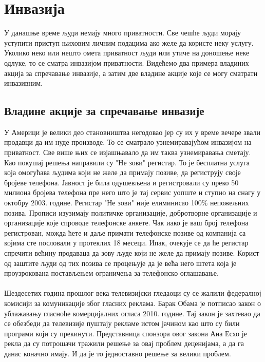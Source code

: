 \documentclass{article}
\begin{document}
\newpage
\section{Инвазија}
У данашње време људи немају много приватности. Све чешће људи морају уступити приступ њиховим личним подацима ако желе да користе неку услугу. Уколико неко или нешто омета приватност људи или утиче на доношење неке одлуке, то се сматра инвазијом приватности. Видећемо два примера владиних акција за спречавање инвазије, а затим две владине акције које се могу сматрати инвазивним.

\subsection{Владине акције за спречавање инвазије}
У Америци је велики део становништва негодовао јер су их у време вечере звали продавци да им нуде производе. То се сматрало узнемиравајућом инвазијом на приватност. Све више њих се изјашњавало да им таква узнемиравања сметају. Као покушај решења направили су "Не зови" регистар. То је бесплатна услуга која омогућава људима који не желе да примају позиве, да региструју своје бројеве телефона. Јавност је била одушевљена и регистровали су преко 50 милиона бројева телефона пре него што је тај сервис уопште и ступио на снагу у октобру 2003. године. Регистар "Не зови" није елиминисао 100\% непожељних позива. Прописи изузимају политичке организације, добротворне организације и организације које спроводе телефонске анкете. Чак иако је ваш број телефона регистрован, можда ћете и даље примати телефонске позиве од компанија са којима сте пословали у протеклих 18 месеци. Ипак, очекује се да ће регистар спречити већину продаваца да зову људе који не желе да примају позиве. Корист од заштите људи од тих позива се процењује да је већа него штета која је проузрокована постављењем ограничења за телефонско оглашавање.
\\\\
Шездесетих година прошлог века телевизијски гледаоци су се жалили федералној комисији за комуникације због гласних реклама. Барак Обама је потписао закон о ублажавању гласноће комерцијалних огласа 2010. године. Тај закон је захтевао да се обезбеди да телевизије пуштају рекламе истом јачином као што су били програми који су прекинути. Представница спонзора овог закона Ана Есхо је рекла да су потрошачи тражили решење за овај проблем деценијама, а да га данас коначно имају. И да је то једноставно решење за велики проблем.
\end{document}
